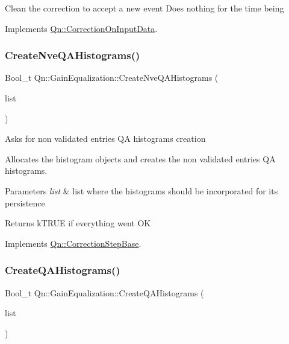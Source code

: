 Clean the correction to accept a new event Does nothing for the time being 

Implements \mbox{\hyperlink{classQn_1_1CorrectionOnInputData_a8da92a3389c8654961199f123d5e6a6d}{Qn\+::\+Correction\+On\+Input\+Data}}.

\mbox{\label{classQn_1_1GainEqualization_aede344344f1f7009f10fc798cfa3241b}} 
\subsubsection{\texorpdfstring{Create\+Nve\+Q\+A\+Histograms()}{CreateNveQAHistograms()}}
{\footnotesize\ttfamily Bool\+\_\+t Qn\+::\+Gain\+Equalization\+::\+Create\+Nve\+Q\+A\+Histograms (\begin{DoxyParamCaption}\item[{T\+List $\ast$}]{list }\end{DoxyParamCaption})\hspace{0.3cm}{\ttfamily [virtual]}}

Asks for non validated entries QA histograms creation

Allocates the histogram objects and creates the non validated entries QA histograms. 
\begin{DoxyParams}{Parameters}
{\em list} & list where the histograms should be incorporated for its persistence \\
\hline
\end{DoxyParams}
\begin{DoxyReturn}{Returns}
k\+T\+R\+UE if everything went OK 
\end{DoxyReturn}


Implements \mbox{\hyperlink{classQn_1_1CorrectionStepBase_acb488e715005f027e39c21ae5f4684da}{Qn\+::\+Correction\+Step\+Base}}.

\mbox{\label{classQn_1_1GainEqualization_a52c68c9bb9632a1e56341dff9e360362}} 
\subsubsection{\texorpdfstring{Create\+Q\+A\+Histograms()}{CreateQAHistograms()}}
{\footnotesize\ttfamily Bool\+\_\+t Qn\+::\+Gain\+Equalization\+::\+Create\+Q\+A\+Histograms (\begin{DoxyParamCaption}\item[{T\+List $\ast$}]{list }\end{DoxyParamCaption})\hspace{0.3cm}{\ttfamily [virtual]}}

